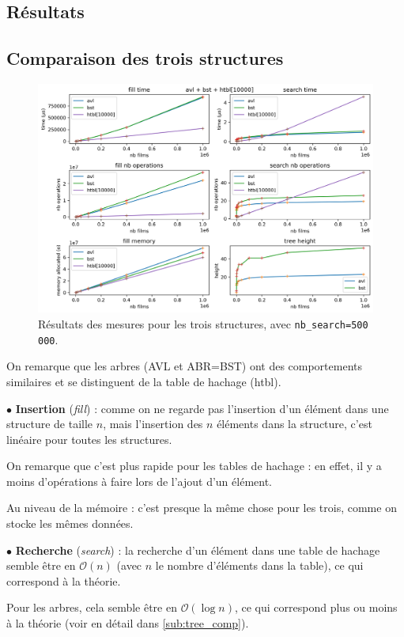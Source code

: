 \documentclass[a4paper, 12pt, twoside]{article}
\begin{document}
\begin{indt}{\section{Résultats}}
\begin{indt}{\subsection{Comparaison des trois structures}}
\begin{figure}[H]
                \includegraphics[width=1.0\textwidth]{../plots/nb_search_500_000/bst_avl_htbl.png}
            
                \caption{Résultats des mesures pour les trois structures, avec \texttt{nb\_search=500 000}.}
                \label{fig:avl_bst_htbl}
            \end{figure}

            On remarque que les arbres (AVL et ABR=BST) ont des comportements similaires et se distinguent de la table de hachage (htbl).

            \vspace{12pt}
            
            $\bullet$ \textbf{Insertion} (\emph{fill}) : comme on ne regarde pas l'insertion d'un élément dans une structure de taille $n$, mais l'insertion des $n$ éléments dans la structure, c'est linéaire pour toutes les structures.

            On remarque que c'est plus rapide pour les tables de hachage : en effet, il y a moins d'opérations à faire lors de l'ajout d'un élément.

            Au niveau de la mémoire : c'est presque la même chose pour les trois, comme on stocke les mêmes données.

            \vspace{12pt}
            
            $\bullet$ \textbf{Recherche} (\emph{search}) : la recherche d'un élément dans une table de hachage semble être en $\mathcal O(n)$ (avec $n$ le nombre d'éléments dans la table), ce qui correspond à la théorie. 

            Pour les arbres, cela semble être en $\mathcal O(\log n)$, ce qui correspond plus ou moins à la théorie (voir en détail dans \ref{sub:tree_comp}).
        \end{indt} %


\end{indt}
\end{document}
